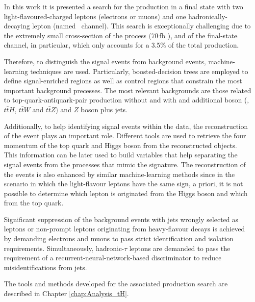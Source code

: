 In this work it is presented a search for the \tHq production in a final state with two light-flavoured-charged 
leptons (electrons or muons) and one hadronically-decaying \Ptau lepton (named \dileptau$\,$ channel).
This search is exceptionally challenging due to the extremely small cross-section of the \tHq process
(70$\,$fb \cite{LHCHiggsCrossSectionWorkingGroup:2016ypw}), and of the \dileptau final-state channel, in particular, which only accounts 
for a 3.5\% of the total \tHq production.

Therefore, to distinguish the \tHq signal events from background events, machine-learning techniques
are used. Particularly, boosted-decision trees are employed to define signal-enriched regions as well
as control regions that constrain the most important background precesses. The most relevant backgrounds
are those related to top-quark-antiquark-pair production without and with and additional boson
(\ttbar, $t\bar{t}H$, $t\bar{t}W$ and $t\bar{t}Z$) and $Z$ boson plus jets. 

Additionally, to help identifying signal events within the data,  the reconstruction of the event plays an important role. 
Different tools are used to retrieve the four momentum of the top quark and Higgs boson from the 
reconstructed objects. This information can be later used to build variables that help separating the
signal events from the processes that mimic the \dileptau signature. 
The reconstruction of the events is also enhanced by similar machine-learning methods
since in the scenario in which the light-flavour leptons have the same sign, a priori, 
it is not possible to determine which lepton is originated from the Higgs boson and 
which from the top quark. 

Significant suppression of the background events with jets wrongly selected as leptons  
or non-prompt leptons originating from heavy-flavour decays
is achieved by demanding electrons and muons to pass strict identification and isolation requirements. 
Simultaneously, hadronic-$\tau$ leptons are demanded to pass the requirement of a
recurrent-neural-network-based discriminator to reduce misidentifications from jets.

The tools and methods developed for the associated \tHq production search are described in Chapter \ref{chap:Analysis_tH}.









